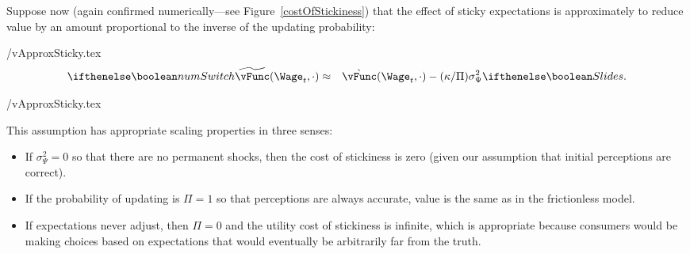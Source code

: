 Suppose now (again confirmed numerically---see Figure~\ref{costOfStickiness}) that the effect of sticky expectations is approximately to reduce value by an amount proportional to the inverse of the updating probability:
\begin{verbatimwrite}{\eq/vApproxSticky.tex}
  \begin{eqnarray}
    \label{eq:vBar}
    \ifnumSw  \perc{\vFunc}(\Wage_t,\cdot) & \approx & \grave{\vFunc}(\Wage_t,\cdot)-(\kappa/\Pi)\sigma^{2}_{\Psi} \label{eq:vApproxSticky}
                                                       \ifslides{}{.}
  \end{eqnarray}
\end{verbatimwrite}

 \eq/vApproxSticky.tex

This assumption has appropriate scaling properties in three senses:
\begin{itemize}
\item If $\sigma^{2}_{\Psi}=0$ so that there are no permanent shocks, then
  the cost of stickiness is zero (given our assumption that initial perceptions are correct).
\item If the probability of updating is $\Pi=1$ so that perceptions
  are always accurate, value is the same as in the frictionless model.
\item If expectations never adjust, then $\Pi=0$ and the utility cost of stickiness is infinite,
  which is appropriate because consumers would be making choices based on
  expectations that would eventually be arbitrarily far from the truth.
\end{itemize}

